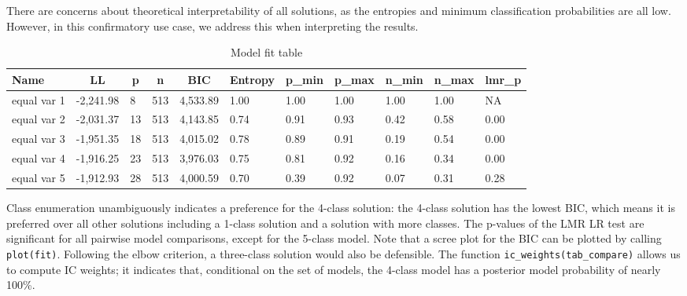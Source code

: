 \documentclass[
  man,floatsintext]{apa6}
\begin{document}
There are concerns about theoretical interpretability of all solutions,
as the entropies and minimum classification probabilities are all low.
However, in this confirmatory use case, we address this when interpreting the results.

\begin{table}[tbp]

\begin{center}
\begin{threeparttable}

\caption{\label{tab:tabfit}Model fit table}

\begin{tabular}{lllllllllll}
\toprule
Name & \multicolumn{1}{c}{LL} & \multicolumn{1}{c}{p} & \multicolumn{1}{c}{n} & \multicolumn{1}{c}{BIC} & \multicolumn{1}{c}{Entropy} & \multicolumn{1}{c}{p\_min} & \multicolumn{1}{c}{p\_max} & \multicolumn{1}{c}{n\_min} & \multicolumn{1}{c}{n\_max} & \multicolumn{1}{c}{lmr\_p}\\
\midrule
equal var 1 & -2,241.98 & 8 & 513 & 4,533.89 & 1.00 & 1.00 & 1.00 & 1.00 & 1.00 & NA\\
equal var 2 & -2,031.37 & 13 & 513 & 4,143.85 & 0.74 & 0.91 & 0.93 & 0.42 & 0.58 & 0.00\\
equal var 3 & -1,951.35 & 18 & 513 & 4,015.02 & 0.78 & 0.89 & 0.91 & 0.19 & 0.54 & 0.00\\
equal var 4 & -1,916.25 & 23 & 513 & 3,976.03 & 0.75 & 0.81 & 0.92 & 0.16 & 0.34 & 0.00\\
equal var 5 & -1,912.93 & 28 & 513 & 4,000.59 & 0.70 & 0.39 & 0.92 & 0.07 & 0.31 & 0.28\\
\bottomrule
\end{tabular}

\end{threeparttable}
\end{center}

\end{table}

Class enumeration unambiguously indicates a preference for the 4-class solution:
the 4-class solution has the lowest BIC,
which means it is preferred over all other solutions including a 1-class solution and a solution with more classes.
The p-values of the LMR LR test are significant for all pairwise model comparisons, except for the 5-class model.
Note that a scree plot for the BIC can be plotted by calling \texttt{plot(fit)}.
Following the elbow criterion, a three-class solution would also be defensible.
The function \texttt{ic\_weights(tab\_compare)} allows us to compute IC weights;
it indicates that, conditional on the set of models,
the 4-class model has a posterior model probability of nearly 100\%.
\end{document}
